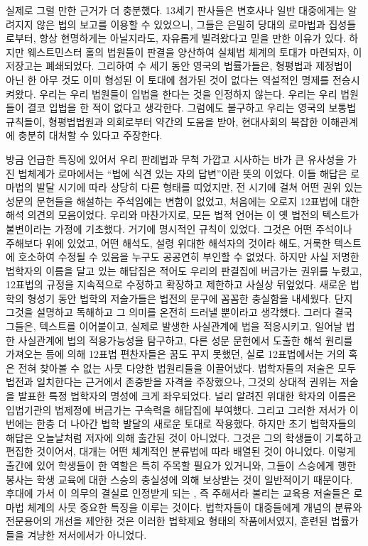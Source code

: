 실제로 그럴 만한 근거가 더 충분했다.
13세기 판사들은 변호사나 일반 대중에게는 알려지지 않은
법의 보고를 이용할 수 있었으니,
그들은 은밀히 당대의 로마법과  집성들로부터, 항상 현명하게는 아닐지라도,
자유롭게 빌려왔다고 믿을 만한 이유가 있다.
하지만 웨스트민스터 홀의 법원들이 판결을 양산하여 실체법 체계의 토대가 마련되자,
이 저장고는 폐쇄되었다.
그리하여 수 세기 동안 영국의 법률가들은, 형평법과 제정법이 아닌 한 아무 것도
이미 형성된 이 토대에 첨가된 것이 없다는 역설적인 명제를 전승시켜왔다.
우리는 우리 법원들이 입법을 한다는 것을 인정하지 않는다.
우리는 우리 법원들이 결코 입법을 한 적이 없다고 생각한다.
그럼에도 불구하고 우리는 영국의 보통법 규칙들이, 형평법법원과
의회로부터 약간의 도움을 받아, 현대사회의 복잡한 이해관계에 충분히 대처할 수 있다고 주장한다.

방금 언급한 특징에 있어서 우리 판례법과 무척 가깝고 시사하는 바가 큰 유사성을 가진 법체계가
로마에서는 ``법에 식견 있는 자의 답변''이란 뜻의 이었다.
이들 해답은 로마법의 발달 시기에 따라 상당히 다른 형태를 띠었지만,
전 시기에 걸쳐 어떤 권위 있는 성문의 문헌들을 해설하는 주석임에는 변함이 없었고,
처음에는 오로지 12표법에 대한 해석 의견의 모음이었다.
우리와 마찬가지로, 모든 법적 언어는 이 옛 법전의 텍스트가 불변이라는 가정에 기초했다.
거기에 명시적인 규칙이 있었다.
그것은 어떤 주석이나 주해보다 위에 있었고, 어떤 해석도, 설령 위대한 해석자의 것이라 해도,
거룩한 텍스트에 호소하여 수정될 수 있음을 누구도 공공연히 부인할 수 없었다.
하지만 사실 저명한 법학자의 이름을 달고 있는 해답집은
적어도 우리의 판결집에 버금가는 권위를 누렸고,
12표법의 규정을 지속적으로 수정하고 확장하고 제한하고 사실상 뒤엎었다.
새로운 법학의 형성기 동안 법학의 저술가들은 법전의 문구에 꼼꼼한 충실함을 내세웠다.
단지 그것을 설명하고 독해하고 그 의미를 온전히 드러낼 뿐이라고 생각했다.
그러다 결국 그들은, 텍스트를 이어붙이고,
실제로 발생한 사실관계에 법을 적응시키고,
일어날 법한 사실관계에 법의 적용가능성을 탐구하고,
다른 성문 문헌에서 도출한 해석 원리를 가져오는 등에 의해
12표법 편찬자들은 꿈도 꾸지 못했던, 실로 12표법에서는 거의 혹은 전혀 찾아볼 수 없는
사뭇 다양한 법원리들을 이끌어냈다.
법학자들의 저술은 모두 법전과 일치한다는 근거에서 존중받을 자격을 주장했으나,
그것의 상대적 권위는 저술을 발표한 특정 법학자의 명성에 크게 좌우되었다.
널리 알려진 위대한 학자의 이름은 입법기관의 법제정에 버금가는 구속력을 해답집에 부여했다.
그리고 그러한 저서가 이번에는 한층 더 나아간 법학 발달의 새로운 토대로 작용했다.
하지만 초기 법학자들의 해답은 오늘날처럼 저자에 의해 출간된 것이 아니었다.
그것은 그의 학생들이 기록하고 편집한 것이어서,
대개는 어떤 체계적인 분류법에 따라 배열된 것이 아니었다.
이렇게 출간에 있어 학생들이 한 역할은 특히 주목할 필요가 있거니와,
그들이 스승에게 행한 봉사는 학생 교육에 대한 스승의 충실성에 의해 보상받는 것이 일반적이기 때문이다.
후대에 가서 이 의무의 결실로 인정받게 되는
, 즉
주해서라 불리는 교육용 저술들은
로마법 체계의 사뭇 중요한 특징을 이루는 것이다.
법학자들이 대중들에게 개념의 분류와 전문용어의 개선을 제안한 것은
이러한 법학제요 형태의 작품에서였지, 훈련된 법률가들을 겨냥한 저서에서가 아니었다.

